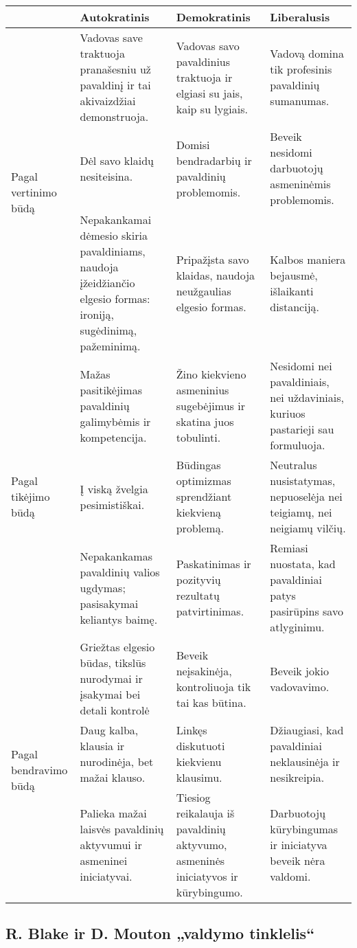 \begin{tabularx}{\textwidth}[]{l | X | X | X}
  & Autokratinis & Demokratinis & Liberalusis \\
  \hline
  \multirow{3}{0.1\textwidth}{Pagal vertinimo būdą}
  & Vadovas save traktuoja pranašesniu už pavaldinį ir tai akivaizdžiai 
    demonstruoja.
  & Vadovas savo pavaldinius traktuoja ir elgiasi su jais, kaip su
    lygiais.
  & Vadovą domina tik profesinis pavaldinių sumanumas. \\
  & Dėl savo klaidų nesiteisina.
  & Domisi bendradarbių ir pavaldinių problemomis.
  & Beveik nesidomi darbuotojų asmeninėmis problemomis. \\
  & Nepakankamai dėmesio skiria pavaldiniams, naudoja įžeidžiančio elgesio 
    formas: ironiją, sugėdinimą, pažeminimą.
  & Pripažįsta savo klaidas, naudoja neužgaulias elgesio formas.
  & Kalbos maniera bejausmė, išlaikanti distanciją. \\
  \hline
  \multirow{3}{0.1\textwidth}{Pagal tikėjimo būdą}
  & Mažas pasitikėjimas pavaldinių galimybėmis ir kompetencija.
  & Žino kiekvieno asmeninius sugebėjimus ir skatina juos tobulinti.
  & Nesidomi nei pavaldiniais, nei uždaviniais, kuriuos pastarieji sau
    formuluoja. \\
  & Į viską žvelgia pesimistiškai.
  & Būdingas optimizmas sprendžiant kiekvieną problemą.
  & Neutralus nusistatymas, nepuoselėja nei teigiamų, nei neigiamų
    vilčių. \\
  & Nepakankamas pavaldinių valios ugdymas; pasisakymai keliantys baimę.
  & Paskatinimas ir pozityvių rezultatų patvirtinimas.
  & Remiasi nuostata, kad pavaldiniai patys pasirūpins savo atlyginimu. \\
  \hline
  \multirow{3}{0.1\textwidth}{Pagal bendravimo būdą}
  & Griežtas elgesio būdas, tikslūs nurodymai ir įsakymai bei detali
    kontrolė
  & Beveik neįsakinėja, kontroliuoja tik tai kas būtina.
  & Beveik jokio vadovavimo. \\
  & Daug kalba, klausia ir nurodinėja, bet mažai klauso.
  & Linkęs diskutuoti kiekvienu klausimu.
  & Džiaugiasi, kad pavaldiniai neklausinėja ir nesikreipia. \\
  & Palieka mažai laisvės pavaldinių aktyvumui ir asmeninei iniciatyvai.
  & Tiesiog reikalauja  iš pavaldinių aktyvumo, asmeninės iniciatyvos ir
    kūrybingumo.
  & Darbuotojų kūrybingumas ir iniciatyva beveik nėra valdomi. \\
\end{tabularx}

\subsection{R. Blake ir D. Mouton „valdymo tinklelis“}

